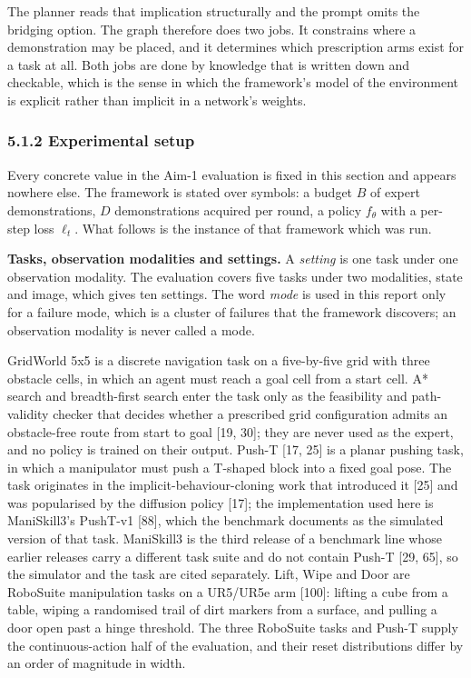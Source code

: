 \documentclass[
  11pt,
]{article}
\begin{document}
The planner reads that implication structurally and the prompt omits the
bridging option. The graph therefore does two jobs. It constrains where
a demonstration may be placed, and it determines which prescription arms
exist for a task at all. Both jobs are done by knowledge that is written
down and checkable, which is the sense in which the framework's model of
the environment is explicit rather than implicit in a network's weights.

\hypertarget{experimental-setup}{%
\subsubsection{5.1.2 Experimental setup}\label{experimental-setup}}

Every concrete value in the Aim-1 evaluation is fixed in this section
and appears nowhere else. The framework is stated over symbols: a budget
\(B\) of expert demonstrations, \(D\) demonstrations acquired per round,
a policy \(f_\theta\) with a per-step loss \(\ell_t\). What follows is
the instance of that framework which was run.

\textbf{Tasks, observation modalities and settings.} A \emph{setting} is
one task under one observation modality. The evaluation covers five
tasks under two modalities, state and image, which gives ten settings.
The word \emph{mode} is used in this report only for a failure mode,
which is a cluster of failures that the framework discovers; an
observation modality is never called a mode.

GridWorld 5x5 is a discrete navigation task on a five-by-five grid with
three obstacle cells, in which an agent must reach a goal cell from a
start cell. A* search and breadth-first search enter the task only as
the feasibility and path-validity checker that decides whether a
prescribed grid configuration admits an obstacle-free route from start
to goal {[}19, 30{]}; they are never used as the expert, and no policy
is trained on their output. Push-T {[}17, 25{]} is a planar pushing
task, in which a manipulator must push a T-shaped block into a fixed
goal pose. The task originates in the implicit-behaviour-cloning work
that introduced it {[}25{]} and was popularised by the diffusion policy
{[}17{]}; the implementation used here is ManiSkill3's PushT-v1
{[}88{]}, which the benchmark documents as the simulated version of that
task. ManiSkill3 is the third release of a benchmark line whose earlier
releases carry a different task suite and do not contain Push-T {[}29,
65{]}, so the simulator and the task are cited separately. Lift, Wipe
and Door are RoboSuite manipulation tasks on a UR5/UR5e arm {[}100{]}:
lifting a cube from a table, wiping a randomised trail of dirt markers
from a surface, and pulling a door open past a hinge threshold. The
three RoboSuite tasks and Push-T supply the continuous-action half of
the evaluation, and their reset distributions differ by an order of
magnitude in width.
\end{document}
